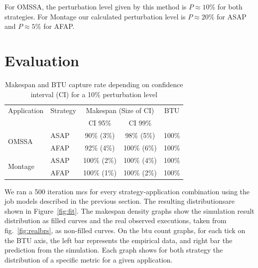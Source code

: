 \documentclass[10pt,conference,compsocconf]{IEEEtran}
\begin{document}

For OMSSA, the perturbation level given by this method is $P\approx{}10\%$ for both
strategies. For Montage  our calculated perturbation level is  $P\approx{}20\%$
for ASAP and $P\approx{}5\%$ for AFAP.


\section{Evaluation}
\label{sec:eval}

\begin{table}
	\centering
	\caption{Makespan and BTU capture rate depending on confidence interval
          (CI) for a 10\% perturbation level}\label{tab:fit}
	\begin{tabular}{llccc}
		\toprule
		Application&Strategy&\multicolumn{2}{c}{Makespan (Size of CI)}&BTU\\
                           &         & CI 95\% & CI 99\% &\\
		\midrule
		\multirow{2}{*}{OMSSA}&ASAP&  90\% (3\%)&  98\% (5\%)& 100\%\\
				      &AFAP&  92\% (4\%)& 100\% (6\%)& 100\%\\
		\midrule
		\multirow{2}{*}{Montage}&ASAP& 100\% (2\%)& 100\% (4\%)& 100\%\\
					&AFAP& 100\% (1\%)& 100\% (2\%)& 100\%\\
		\bottomrule
	\end{tabular}
\end{table}

We ran a 500 iteration \ac{mcs} for every strategy-application combination using
the job models described in the previous section. The resulting distributionsare
shown in Figure~\ref{fig:fit}.  The makespan density graphs  show the simulation
result distribution  as filled  curves and the  real observed  executions, taken
from  fig.~\ref{fig:realbrs},  as  non-filled  curves.  On  the  \ac{btu}  count
graphs, for  each tick on  the BTU axis, the  left bar represents  the empirical
data, and  right bar the prediction  from the simulation.  Each  graph shows for
both strategy the distribution of a specific metric for a given application.
\end{document}
